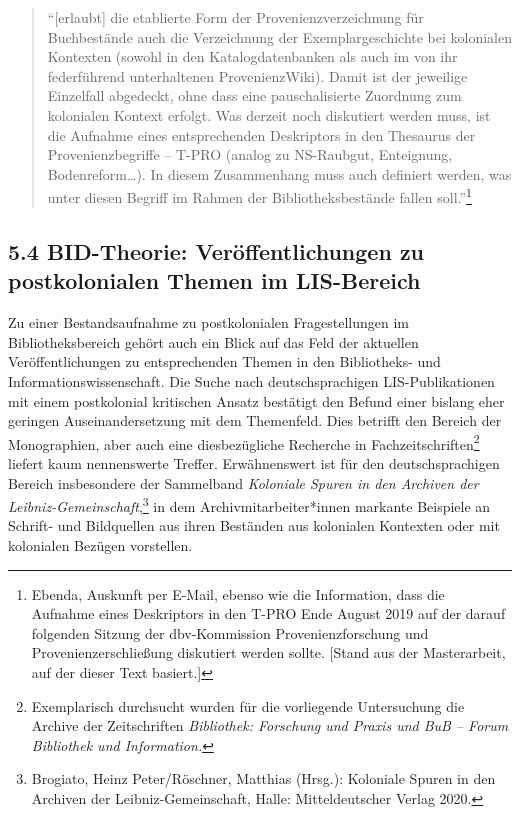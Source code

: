 \documentclass[a4paper,
fontsize=11pt,
oneside,
numbers=noperiodatend,
parskip=half-,
bibliography=totoc,
final
]{scrartcl}
\begin{document}
\begin{quote}
\enquote{{[}erlaubt{]} die etablierte Form der Provenienzverzeichnung
für Buchbestände auch die Verzeichnung der Exemplargeschichte bei
kolonialen Kontexten (sowohl in den Katalogdatenbanken als auch im von
ihr federführend unterhaltenen ProvenienzWiki). Damit ist der jeweilige
Einzelfall abgedeckt, ohne dass eine pauschalisierte Zuordnung zum
kolonialen Kontext erfolgt. Was derzeit noch diskutiert werden muss, ist
die Aufnahme eines entsprechenden Deskriptors in den Thesaurus der
Provenienzbegriffe -- T-PRO (analog zu NS-Raubgut, Enteignung,
Bodenreform\ldots). In diesem Zusammenhang muss auch definiert werden,
was unter diesen Begriff im Rahmen der Bibliotheksbestände fallen
soll.}\footnote{Ebenda, Auskunft per E-Mail, ebenso wie die Information,
  dass die Aufnahme eines Deskriptors in den T-PRO Ende August 2019 auf
  der darauf folgenden Sitzung der dbv-Kommission Provenienzforschung
  und Provenienzerschließung diskutiert werden sollte. {[}Stand aus der
  Masterarbeit, auf der dieser Text basiert.{]}}
\end{quote}

\hypertarget{bid-theorie-veruxf6ffentlichungen-zu-postkolonialen-themen-im-lis-bereich}{%
\subsection{5.4 BID-Theorie: Veröffentlichungen zu postkolonialen Themen
im
LIS-Bereich}\label{bid-theorie-veruxf6ffentlichungen-zu-postkolonialen-themen-im-lis-bereich}}

Zu einer Bestandsaufnahme zu postkolonialen Fragestellungen im
Bibliotheksbereich gehört auch ein Blick auf das Feld der aktuellen
Veröffentlichungen zu entsprechenden Themen in den Bibliotheks- und
Informationswissenschaft. Die Suche nach deutschsprachigen
LIS-Publikationen mit einem postkolonial kritischen Ansatz bestätigt den
Befund einer bislang eher geringen Auseinandersetzung mit dem
Themenfeld. Dies betrifft den Bereich der Monographien, aber auch eine
diesbezügliche Recherche in Fachzeitschriften\footnote{Exemplarisch
  durchsucht wurden für die vorliegende Untersuchung die Archive der
  Zeitschriften \emph{Bibliothek: Forschung und Praxis und BuB -- Forum
  Bibliothek und Information.}} liefert kaum nennenswerte Treffer.
Erwähnenswert ist für den deutschsprachigen Bereich insbesondere der
Sammelband \emph{Koloniale Spuren in den Archiven der
Leibniz-Gemeinschaft},\footnote{Brogiato, Heinz Peter/Röschner, Matthias
  (Hrsg.): Koloniale Spuren in den Archiven der Leibniz-Gemeinschaft,
  Halle: Mitteldeutscher Verlag 2020.} in dem Archivmitarbeiter*innen
markante Beispiele an Schrift- und Bildquellen aus ihren Beständen aus
kolonialen Kontexten oder mit kolonialen Bezügen vorstellen.
\end{document}
